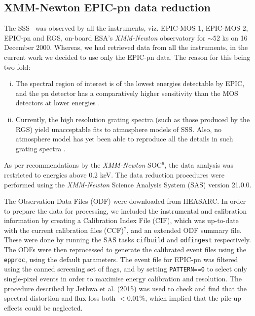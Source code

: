     \subsection{XMM-Newton EPIC-pn data reduction}
    	The SSS \source\ was observed by all the instruments, viz. EPIC-MOS 1, EPIC-MOS 2, EPIC-pn and RGS, on-board ESA's \textit{XMM-Newton} observatory for $\sim 52$ ks on 16 December 2000. Whereas, we had retrieved data from all the instruments, in the current work we decided to use only the EPIC-pn data. The reason for this being two-fold:
    	\begin{enumerate}[i.]
    		\item The spectral region of interest is of the lowest energies detectable by EPIC, and the pn detector has a comparatively higher sensitivity than the MOS detectors at lower energies \cite{stecchini2023revisiting,mateos2009statistical}.
    		\item Currently, the high resolution grating spectra (such as those produced by the RGS) yield unacceptable fits to atmosphere models of SSS. Also, no atmosphere model has yet been able to reproduce all the details in such grating spectra \cite{ness2020complications}.
    	\end{enumerate}
    	As per recommendations by the \textit{XMM-Newton} SOC$^6$, the data analysis was restricted to energies above 0.2 keV. The data reduction procedures were performed using the \textit{XMM-Newton} Science Analysis System (SAS) version 21.0.0.
    
    	The Observation Data Files (ODF) were downloaded from HEASARC. In order to prepare the data for processing, we included the instrumental and calibration information by creating a Calibration Index File (CIF), which was up-to-date with the current calibration files (CCF)$^7$, and an extended ODF summary file. These were done by running the SAS tasks \texttt{cifbuild} and \texttt{odfingest} respectively. The ODFs were then reprocessed to generate the calibrated event files using the \texttt{epproc}, using the default parameters. The event file for EPIC-pn was filtered using the canned screening set of flags, and by setting \texttt{PATTERN==0} to select only single-pixel events in order to maximise energy calibration and resolution. The procedure described by Jethwa et al. (2015) \cite{jethwa2015pile} was used to check and find that the spectral distortion and flux loss both $<0.01\%$, which implied that the pile-up effects could be neglected.
    
